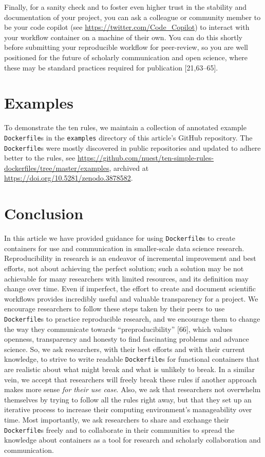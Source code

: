 \documentclass[10pt,letterpaper]{article}
\begin{document}
Finally, for a sanity check and to foster even higher trust in the
stability and documentation of your project, you can ask a colleague or
community member to be your code copilot (see
\url{https://twitter.com/Code_Copilot}) to interact with your workflow
container on a machine of their own. You can do this shortly before
submitting your reproducible workflow for peer-review, so you are well
positioned for the future of scholarly communication and open science,
where these may be standard practices required for publication
{[}21,63--65{]}.

\hypertarget{examples}{%
\section{Examples}\label{examples}}

To demonstrate the ten rules, we maintain a collection of annotated
example \texttt{Dockerfile}s in the \texttt{examples} directory of this
article's GitHub repository. The \texttt{Dockerfile}s were mostly
discovered in public repositories and updated to adhere better to the
rules, see
\url{https://github.com/nuest/ten-simple-rules-dockerfiles/tree/master/examples},
archived at \url{https://doi.org/10.5281/zenodo.3878582}.

\hypertarget{conclusion}{%
\section*{Conclusion}\label{conclusion}}

In this article we have provided guidance for using \texttt{Dockerfile}s
to create containers for use and communication in smaller-scale data
science research. Reproducibility in research is an endeavor of
incremental improvement and best efforts, not about achieving the
perfect solution; such a solution may be not achievable for many
researchers with limited resources, and its definition may change over
time. Even if imperfect, the effort to create and document scientific
workflows provides incredibly useful and valuable transparency for a
project. We encourage researchers to follow these steps taken by their
peers to use \texttt{Dockerfile}s to practice reproducible research, and
we encourage them to change the way they communicate towards
``preproducibility'' {[}66{]}, which values openness, transparency and
honesty to find fascinating problems and advance science. So, we ask
researchers, with their best efforts and with their current knowledge,
to strive to write readable \texttt{Dockerfile}s for functional
containers that are realistic about what might break and what is
unlikely to break. In a similar vein, we accept that researchers will
freely break these rules if another approach makes more sense \emph{for
their use case}. Also, we ask that researchers not overwhelm themselves
by trying to follow all the rules right away, but that they set up an
iterative process to increase their computing environment's
manageability over time. Most importantly, we ask researchers to share
and exchange their \texttt{Dockerfile}s freely and to collaborate in
their communities to spread the knowledge about containers as a tool for
research and scholarly collaboration and communication.
\end{document}
